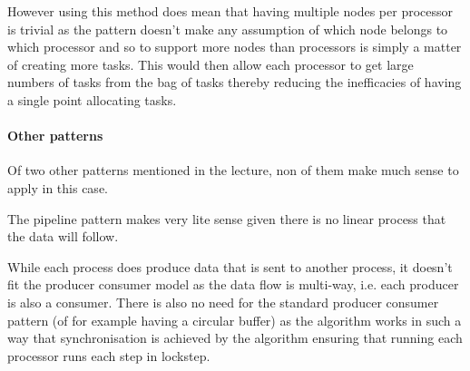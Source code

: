 \documentclass[11pt,a4paper]{article}
\begin{document}
However using this method does mean that having multiple nodes per processor is trivial as the pattern doesn't make any assumption of which node belongs to which processor and so to support more nodes than processors is simply a matter of creating more tasks. This would then allow each processor to get large numbers of tasks from the bag of tasks thereby reducing the inefficacies of having a single point allocating tasks.

%


\paragraph{Other patterns}
Of two other patterns mentioned in the lecture, non of them make much sense to apply in this case.  

The pipeline pattern makes very lite sense given there is no linear process that the data will follow.

While each process does produce data that is sent to another process, it doesn't fit the producer consumer model as the data flow is multi-way, i.e. each producer is also a consumer. There is also no need for the standard producer consumer pattern (of for example having a circular buffer) as the algorithm works in such a way that synchronisation is achieved by the algorithm ensuring that running each processor runs each step in lockstep.
\end{document}
